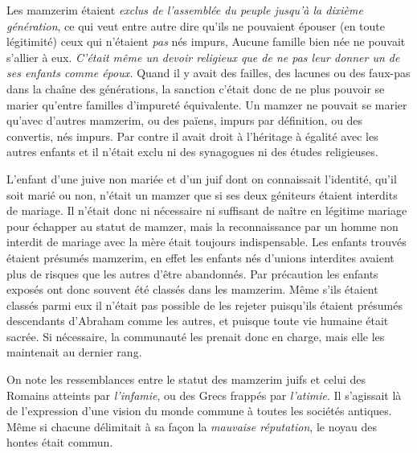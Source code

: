  Les mamzerim étaient \emph{exclus de l'assemblée du peuple jusqu'à la dixième génération}, ce qui veut entre autre dire qu'ils ne pouvaient épouser (en toute légitimité) ceux qui n'étaient \emph{pas} nés impurs, Aucune famille bien née ne pouvait s'allier à eux. \emph{C'était même un devoir religieux que de ne pas leur donner un de ses enfants comme époux.} Quand il y avait des failles, des lacunes ou des faux-pas dans la chaîne des générations, la sanction c'était donc de ne plus pouvoir se marier qu'entre familles d'impureté équivalente. Un mamzer ne pouvait se marier qu'avec d'autres mamzerim, ou des païens, impurs par définition, ou des convertis, nés impurs. Par contre il avait droit à l'héritage à égalité avec les autres enfants et il n'était exclu ni des synagogues ni des études religieuses.
 
 L'enfant d'une juive non mariée et d'un juif dont on connaissait l'identité, qu'il soit marié ou non, n'était un mamzer que si ses deux géniteurs étaient interdits de mariage. Il n'était donc ni nécessaire ni suffisant de naître en légitime mariage pour échapper au statut de mamzer, mais la reconnaissance par un homme non interdit de mariage avec la mère était toujours indispensable. Les enfants trouvés étaient présumés mamzerim, en effet les enfants nés d'unions interdites avaient plus de risques que les autres d'être abandonnés. Par précaution les enfants exposés ont donc souvent été classés dans les mamzerim. Même s'ils étaient classés parmi eux il n'était pas possible de les rejeter puisqu'ils étaient présumés descendants d'Abraham comme les autres, et puisque toute vie humaine était sacrée. Si nécessaire, la communauté les prenait donc en charge, mais elle les maintenait au dernier rang.


 On note les ressemblances entre le statut des mamzerim juifs et celui des Romains atteints par \emph{l'infamie}, ou des Grecs frappés par \emph{l'atimie}. Il s'agissait là de l'expression d'une vision du monde commune à toutes les sociétés antiques. Même si chacune délimitait à sa façon la \emph{mauvaise réputation}, le noyau des hontes était commun. 

